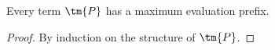 \begin{lemma}\label{thm:cp-maximum-evaluation-prefix}
  Every term $\tm{P}$ has a maximum evaluation prefix.
\end{lemma}
\begin{proof}
  By induction on the structure of $\tm{P}$.
\end{proof}
